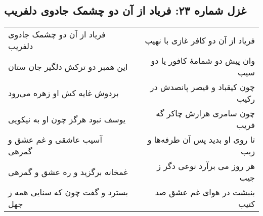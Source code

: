 \begin{center}
\section*{غزل شماره ۲۳: فریاد از آن دو چشمک جادوی دلفریب}
\label{sec:023}
\begin{longtable}{l p{0.5cm} r}
فریاد از آن دو چشمک جادوی دلفریب
&&
فریاد از آن دو کافر غازی با نهیب
\\
این همبر دو ترکش دلگیر جان ستان
&&
وان پیش دو شمامهٔ کافور یا دو سیب
\\
بردوش غایه کش او زهره می‌رود
&&
چون کیقباد و قیصر پانصدش در رکیب
\\
یوسف نبود هرگز چون او به نیکویی
&&
چون سامری هزارش چاکر گه فریب
\\
آسیب عاشقی و غم عشق و گمرهی
&&
تا روی او بدید پس آن طرفه‌ها و زیب
\\
غمخانه برگزید و ره عشق و گمرهی
&&
هر روز می برآرد نوعی دگر ز جیب
\\
بسترد و گفت چون که سنایی همه ز جهل
&&
بنبشت در هوای غم عشق صد کتیب
\\
\end{longtable}
\end{center}
